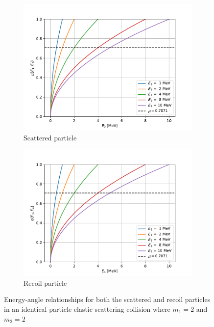 \begin{figure}[!htb]
  \centering
  \begin{subfigure}{.5\textwidth}
    \centering
    \includegraphics[width=\linewidth]{../figures/particle_kinematics/identical_energy_angle.pdf}
    \caption{Scattered particle}
    \label{fig:identical-elastic-energy-angle-scattered}
  \end{subfigure}%
  \begin{subfigure}{.5\textwidth}
    \centering
    \includegraphics[width=\linewidth]{../figures/particle_kinematics/identical_recoil_energy_angle.pdf}
    \caption{Recoil particle}
    \label{fig:identical-elastic-energy-angle-recoil}
  \end{subfigure}
  \caption{Energy-angle relationships for both the scattered and recoil particles in an identical particle elastic scattering collision where $m_1 = 2$ and $m_2 = 2$}
  \label{fig:identical-elastic-energy-angle}
\end{figure}
